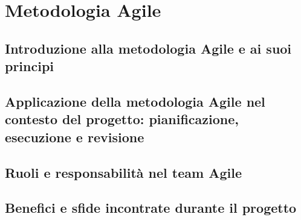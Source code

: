 \chapter{Metodologia Agile}
\label{cha:agile}

\section{Introduzione alla metodologia Agile e ai suoi principi}
\label{sec:introduzione_agile}

\lipsum[1]

\section{Applicazione della metodologia Agile nel contesto del progetto: pianificazione,
esecuzione e revisione}
\label{sec:applicazione_agile}

\lipsum[1]

\section{Ruoli e responsabilità nel team Agile}
\label{sec:ruoli_agile}

\lipsum[1]

\section{Benefici e sfide incontrate durante il progetto}
\label{sec:benefici_sfide_agile}

\lipsum[1]